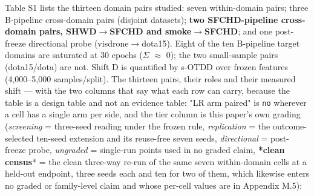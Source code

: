 \documentclass[pdflatex,sn-mathphys-ay]{sn-jnl}
\begin{document}
Table S1 lists the thirteen domain pairs studied: seven within-domain pairs; three B-pipeline cross-domain pairs (disjoint datasets); \textbf{two SFCHD-pipeline cross-domain pairs, SHWD\ensuremath{\rightarrow}SFCHD and smoke\ensuremath{\rightarrow}SFCHD}; and one post-freeze directional probe (visdrone\ensuremath{\rightarrow}dota15). Eight of the ten B-pipeline target domains are saturated at 30 epochs (\ensuremath{\Sigma} \ensuremath{\approx} 0); the two small-sample pairs (dota15/dota) are not. Shift D is quantified by s-OTDD over frozen features (4,000--5,000 samples/split). The thirteen pairs, their roles and their measured shift --- with the two columns that say what each row can carry, because the table is a design table and not an evidence table: "LR arm paired" is \texttt{no} wherever a cell has a single arm per side, and the tier column is this paper's own grading (\emph{screening} = three-seed reading under the frozen rule, \emph{replication} = the outcome-selected ten-seed extension and its reuse-free seven seeds, \emph{directional} = post-freeze probe, \emph{ungraded} = single-run points used in no graded claim, \textbf{*clean census}* = the clean three-way re-run of the same seven within-domain cells at a held-out endpoint, three seeds each and ten for two of them, which likewise enters no graded or family-level claim and whose per-cell values are in Appendix M.5):
\end{document}
